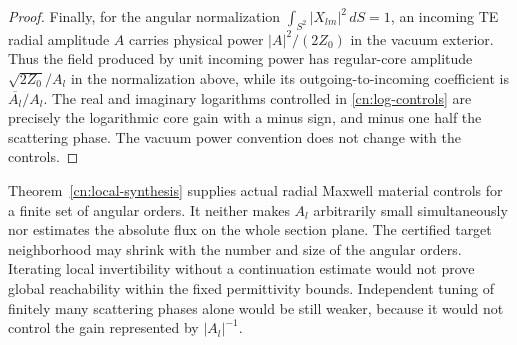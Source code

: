 \begin{proof}
Finally, for the angular normalization
$\int_{S^2}|X_{lm}|^2\,dS=1$, an incoming TE radial amplitude
$A$ carries physical power $|A|^2/(2Z_0)$ in the vacuum exterior.
Thus the field produced by unit incoming power has regular-core
amplitude $\sqrt{2Z_0}/A_l$ in the normalization above, while its
outgoing-to-incoming coefficient is
$\overline{A_l}/A_l$.  The real and imaginary logarithms controlled
in \eqref{cn:log-controls} are precisely the logarithmic core gain
with a minus sign, and minus one half the scattering phase.
The vacuum power convention does not change with the controls.
\end{proof}

\begin{remark}
\label{cn:local-synthesis-scope}
Theorem~\ref{cn:local-synthesis} supplies actual radial Maxwell
material controls for a finite set of angular orders.  It neither
makes $A_l$ arbitrarily small simultaneously nor estimates the
absolute flux on the whole section plane.  The certified target
neighborhood may shrink with the number and size of the angular
orders.  Iterating local invertibility without a continuation
estimate would not prove global reachability within the fixed
permittivity bounds.  Independent tuning of finitely many scattering
phases alone would be still weaker, because it would not control
the gain represented by $|A_l|^{-1}$.
\end{remark}

